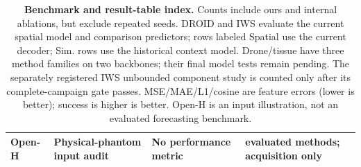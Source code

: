 \begin{table}[!htb]
\begin{tabular}{@{}>{\raggedright\arraybackslash}p{.13\linewidth}>{\raggedright\arraybackslash}p{.23\linewidth}>{\raggedright\arraybackslash}p{.23\linewidth}>{\raggedright\arraybackslash}p{.32\linewidth}@{}}
Open-H & Physical-phantom input audit & No performance metric & 0 evaluated methods; acquisition only \\
\bottomrule\end{tabular}
\caption{\textbf{Benchmark and result-table index.} Counts include ours and internal
ablations, but exclude repeated seeds. DROID and IWS evaluate the current spatial model and comparison predictors;
rows labeled Spatial use the current decoder; Sim. rows use the historical
context model. Drone/tissue have three method
families on two backbones; their final model tests remain pending. The separately
registered IWS unbounded component study is counted only after its complete-campaign
gate passes. MSE/MAE/L1/cosine
are feature errors (lower is better); success is higher is better. Open-H is an
input illustration, not an evaluated forecasting benchmark.}
\label{tab:comparison-coverage}\end{table}
